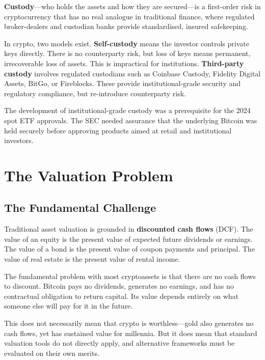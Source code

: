 \documentclass[11pt,a4paper]{article}
\newcommand{\keyword}[1]{\textbf{\textcolor{AccentOrange}{#1}}}
\begin{document}
\keyword{Custody}---who holds the assets and how they are secured---is a first-order risk in cryptocurrency that has no real analogue in traditional finance, where regulated broker-dealers and custodian banks provide standardised, insured safekeeping.

In crypto, two models exist. \textbf{Self-custody} means the investor controls private keys directly. There is no counterparty risk, but loss of keys means permanent, irrecoverable loss of assets. This is impractical for institutions. \textbf{Third-party custody} involves regulated custodians such as Coinbase Custody, Fidelity Digital Assets, BitGo, or Fireblocks. These provide institutional-grade security and regulatory compliance, but re-introduce counterparty risk.

The development of institutional-grade custody was a prerequisite for the 2024 spot ETF approvals. The SEC needed assurance that the underlying Bitcoin was held securely before approving products aimed at retail and institutional investors.

\section{The Valuation Problem}

\subsection{The Fundamental Challenge}

Traditional asset valuation is grounded in \keyword{discounted cash flows} (DCF). The value of an equity is the present value of expected future dividends or earnings. The value of a bond is the present value of coupon payments and principal. The value of real estate is the present value of rental income.

The fundamental problem with most cryptoassets is that there are no cash flows to discount. Bitcoin pays no dividends, generates no earnings, and has no contractual obligation to return capital. Its value depends entirely on what someone else will pay for it in the future.

This does not necessarily mean that crypto is worthless---gold also generates no cash flows, yet has sustained value for millennia. But it does mean that standard valuation tools do not directly apply, and alternative frameworks must be evaluated on their own merits.
\end{document}
